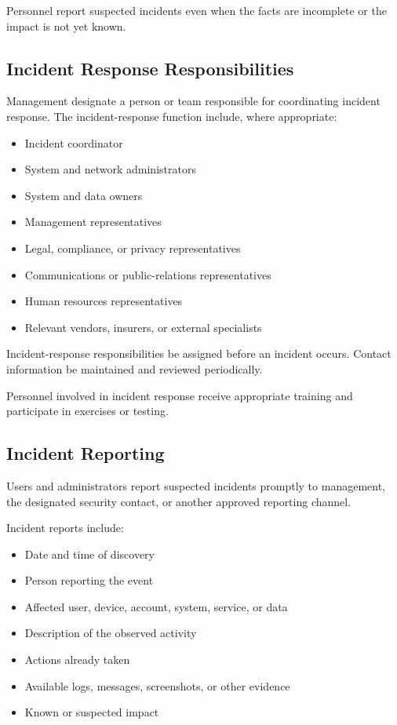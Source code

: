 Personnel \must{} report suspected incidents even when the facts are incomplete or the impact is not yet known.

\subsection{Incident Response Responsibilities}

Management \must{} designate a person or team responsible for coordinating incident response. The incident-response function \should{} include, where appropriate:
\begin{itemize}
    \item Incident coordinator
    \item System and network administrators
    \item System and data owners
    \item Management representatives
    \item Legal, compliance, or privacy representatives
    \item Communications or public-relations representatives
    \item Human resources representatives
    \item Relevant vendors, insurers, or external specialists
\end{itemize}

Incident-response responsibilities \must{} be assigned before an incident occurs. Contact information \must{} be maintained and reviewed periodically.

Personnel involved in incident response \should{} receive appropriate training and participate in exercises or testing.

\subsection{Incident Reporting}

Users and administrators \must{} report suspected incidents promptly to management, the designated security contact, or another approved reporting channel.

Incident reports \should{} include:
\begin{itemize}
    \item Date and time of discovery
    \item Person reporting the event
    \item Affected user, device, account, system, service, or data
    \item Description of the observed activity
    \item Actions already taken
    \item Available logs, messages, screenshots, or other evidence
    \item Known or suspected impact
\end{itemize}

